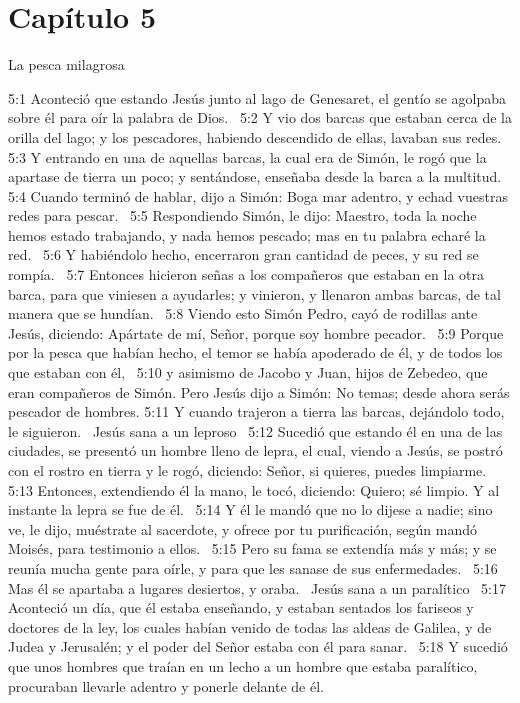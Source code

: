 \section*{Capítulo 5 }
La pesca milagrosa   

5:1 Aconteció que estando Jesús junto al lago de Genesaret, el gentío se agolpaba sobre él para oír la palabra de Dios.  
5:2 Y vio dos barcas que estaban cerca de la orilla del lago; y los pescadores, habiendo descendido de ellas, lavaban sus redes.  
5:3 Y entrando en una de aquellas barcas, la cual era de Simón, le rogó que la apartase de tierra un poco; y sentándose, enseñaba desde la barca a la multitud. 
5:4 Cuando terminó de hablar, dijo a Simón: Boga mar adentro, y echad vuestras redes para pescar.  
5:5 Respondiendo Simón, le dijo: Maestro, toda la noche hemos estado trabajando, y nada hemos pescado; mas en tu palabra echaré la red.  
5:6 Y habiéndolo hecho, encerraron gran cantidad de peces, y su red se rompía.  
5:7 Entonces hicieron señas a los compañeros que estaban en la otra barca, para que viniesen a ayudarles; y vinieron, y llenaron ambas barcas, de tal manera que se hundían.  
5:8 Viendo esto Simón Pedro, cayó de rodillas ante Jesús, diciendo: Apártate de mí, Señor, porque soy hombre pecador.  
5:9 Porque por la pesca que habían hecho, el temor se había apoderado de él, y de todos los que estaban con él,  
5:10 y asimismo de Jacobo y Juan, hijos de Zebedeo, que eran compañeros de Simón. Pero Jesús dijo a Simón: No temas; desde ahora serás pescador de hombres. 
5:11 Y cuando trajeron a tierra las barcas, dejándolo todo, le siguieron.  
Jesús sana a un leproso   
5:12 Sucedió que estando él en una de las ciudades, se presentó un hombre lleno de lepra, el cual, viendo a Jesús, se postró con el rostro en tierra y le rogó, diciendo: Señor, si quieres, puedes limpiarme.  
5:13 Entonces, extendiendo él la mano, le tocó, diciendo: Quiero; sé limpio. Y al instante la lepra se fue de él.  
5:14 Y él le mandó que no lo dijese a nadie; sino ve, le dijo, muéstrate al sacerdote, y ofrece por tu purificación, según mandó Moisés, para testimonio a ellos.  
5:15 Pero su fama se extendía más y más; y se reunía mucha gente para oírle, y para que les sanase de sus enfermedades.  
5:16 Mas él se apartaba a lugares desiertos, y oraba.  
Jesús sana a un paralítico   
5:17 Aconteció un día, que él estaba enseñando, y estaban sentados los fariseos y doctores de la ley, los cuales habían venido de todas las aldeas de Galilea, y de Judea y Jerusalén; y el poder del Señor estaba con él para sanar.  
5:18 Y sucedió que unos hombres que traían en un lecho a un hombre que estaba paralítico, procuraban llevarle adentro y ponerle delante de él.  
